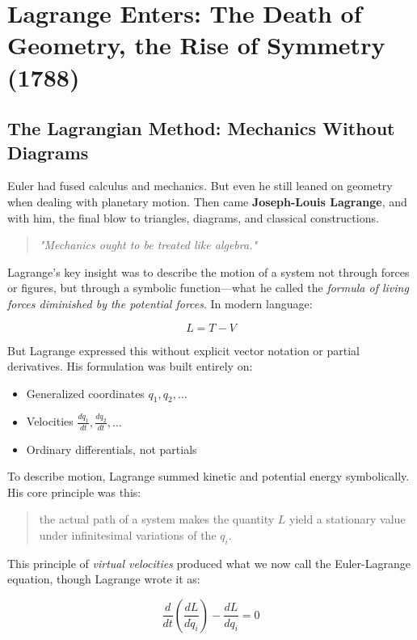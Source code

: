 \section{Lagrange Enters: The Death of Geometry, the Rise of Symmetry (1788)}



\subsection*{The Lagrangian Method: Mechanics Without Diagrams}


Euler had fused calculus and mechanics. But even he still leaned on geometry when dealing with planetary motion. Then came \textbf{Joseph-Louis Lagrange}, and with him, the final blow to triangles, diagrams, and classical constructions.

\begin{quote}
\textit{"Mechanics ought to be treated like algebra."}
\end{quote}

Lagrange’s key insight was to describe the motion of a system not through forces or figures, but through a symbolic function—what he called the \textit{formula of living forces diminished by the potential forces}. In modern language:

\[
L = T - V
\]

But Lagrange expressed this without explicit vector notation or partial derivatives. His formulation was built entirely on:
\begin{itemize}
    \item Generalized coordinates \( q_1, q_2, \ldots \)
    \item Velocities \( \frac{dq_1}{dt}, \frac{dq_2}{dt}, \ldots \)
    \item Ordinary differentials, not partials
\end{itemize}

To describe motion, Lagrange summed kinetic and potential energy symbolically. His core principle was this: 

\begin{quote}
the actual path of a system makes the quantity \( L \) yield a stationary value under infinitesimal variations of the \( q_i \). 
\end{quote}

This principle of \textit{virtual velocities} produced what we now call the Euler-Lagrange equation, though Lagrange wrote it as:

\[
\frac{d}{dt} \left( \frac{dL}{d\dot{q}_i} \right) - \frac{dL}{dq_i} = 0
\]

